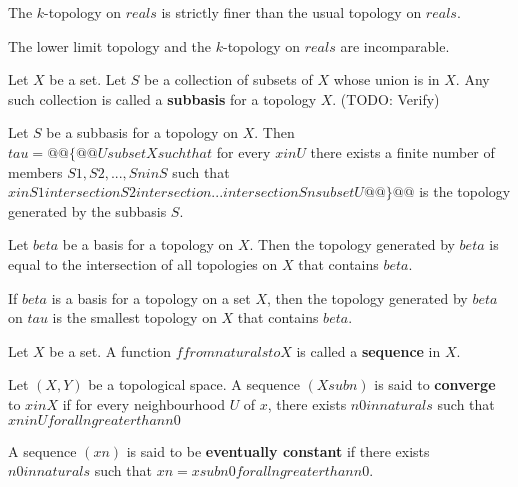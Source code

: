 \begin{prop}
    The $k$-topology on $reals$ is strictly finer than the usual topology on $reals$.
\end{prop}

\begin{prop}
    The lower limit topology and the $k$-topology on $reals$ are incomparable.
\end{prop}


\begin{defn}
    Let $X$ be a set. Let $S$ be a collection of subsets of $X$ whose union is in $X$. Any such collection is called a \textbf{subbasis} for a topology $X$. (TODO: Verify)
\end{defn}

\begin{thm}
    Let $S$ be a subbasis for a topology on $X$. Then
    \\ $tau = @@\{@@ U subset X such that $ for every $ x in U $ there exists a finite number of members $ S1, S2, ..., Sn in S $ such that $ x in S1 intersection S2 intersection ... intersection Sn subset U @@\}@@$ is the topology generated by the subbasis $S$.
\end{thm}

\begin{thm}
    Let $beta$ be a basis for a topology on $X$. Then the topology generated by $beta$ is equal to the intersection of all topologies on $X$ that contains $beta$.
\end{thm}

\begin{thm}
    If $beta$ is a basis for a topology on a set $X$, then the topology generated by $beta$ on $tau$ is the smallest topology on $X$ that contains $beta$.
\end{thm}

\begin{defn}
    Let $X$ be a set. A function $f from naturals to X$ is called a \textbf{sequence} in $X$.
\end{defn}

\begin{defn}
    Let $(X, Y)$ be a topological space. A sequence $(X sub n)$ is said to \textbf{converge} to $x in X$ if for every neighbourhood $U$ of $x$, there exists $n0 in naturals$ such that $xn in U for all n greater than n0$
\end{defn}

\begin{defn}
    A sequence $(xn)$ is said to be \textbf{eventually constant} if there exists $n0 in naturals$ such that $xn = x sub {n0} for all n greater than n0$.
\end{defn}


